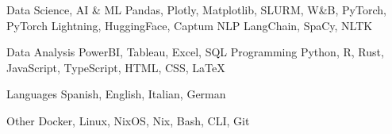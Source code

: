 

\begin{cvskills}


  \cvskill
    {Data Science, AI \& ML} %
    {Pandas, Plotly, Matplotlib, SLURM, W\&B, PyTorch, PyTorch Lightning, HuggingFace, Captum} %
  \cvskill
    {NLP} %
    {LangChain, SpaCy, NLTK} %

  \cvskill
    {Data Analysis}
    {PowerBI, Tableau, Excel, SQL}
  \cvskill
    {Programming} %
    {Python, R, Rust, JavaScript, TypeScript, HTML, CSS, LaTeX} %

  \cvskill
    {Languages} %
    {Spanish, English, Italian, German} %

  \cvskill
    {Other}
    {Docker, Linux, NixOS, Nix, Bash, CLI, Git}

\end{cvskills}
